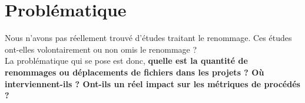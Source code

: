 \section{Problématique}
\label{sec:problematique}
Nous n'avons pas réellement trouvé d'études traitant le renommage. Ces études ont-elles volontairement ou non omis le renommage ? \\
La problématique qui se pose est donc, \textbf{quelle est la quantité de renommages ou déplacements de fichiers dans les projets ? Où interviennent-ils ? Ont-ils un réel impact sur les métriques de procédés ?} \\
